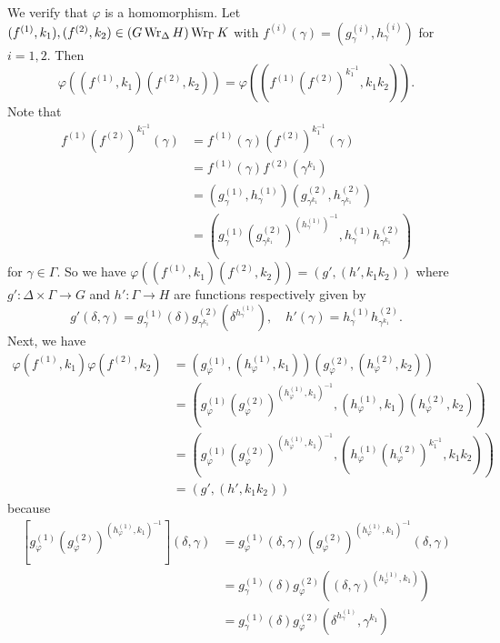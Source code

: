\begin{sketch}
We verify that $\varphi$ is a homomorphism. Let $(f^{(1)},k_1),(f^{(2)},k_2)\in (G\operatorname{Wr}_\Delta H) \operatorname{Wr}_\Gamma K$ with $f^{(i)}(\gamma) = (g^{(i)}_\gamma, h^{(i)}_\gamma)$  for $i=1,2$. Then
\begin{equation*}
	\varphi((f^{(1)},k_1)(f^{(2)},k_2)) = \varphi((f^{(1)}(f^{(2)})^{k_1^{-1}},k_1k_2)).
\end{equation*}
Note that 
\begin{align*}
	f^{(1)}(f^{(2)})^{k_1^{-1}}(\gamma) &= f^{(1)}(\gamma)(f^{(2)})^{k_1^{-1}}(\gamma) 
	\\
	&= 
	f^{(1)}(\gamma)f^{(2)}(\gamma^{k_1}) 
	\\
	&=(g^{(1)}_\gamma, h^{(1)}_\gamma)(g^{(2)}_{\gamma^{k_1}}, h^{(2)}_{\gamma^{k_1}})
	\\
	&= \left(g^{(1)}_\gamma (g^{(2)}_{\gamma^{k_1}})^{(h^{(1)}_\gamma)^{-1}}, h^{(1)}_\gamma h^{(2)}_{\gamma^{k_1}}\right)
\end{align*} for $\gamma\in\Gamma$. So we have $\varphi((f^{(1)},k_1)(f^{(2)},k_2)) = (g',(h',k_1k_2))$ where $g':\Delta\times\Gamma\to G$ and $h':\Gamma \to H$ are functions respectively given by
\begin{equation*}
	g'(\delta,\gamma) = g^{(1)}_\gamma(\delta)g^{(2)}_{\gamma^{k_1}}(\delta^{h_\gamma^{(1)}}),\quad h'(\gamma) = h^{(1)}_\gamma h^{(2)}_{\gamma^{k_1}}.
\end{equation*}
Next, we have 
\begin{align*}
	\varphi(f^{(1)},k_1) \varphi(f^{(2)},k_2) &= \left(g_\varphi^{(1)},(h_\varphi^{(1)},k_1)\right)\left(g_\varphi^{(2)},(h_\varphi^{(2)},k_2)\right)
	\\
	&= \left(g_\varphi^{(1)}(g_\varphi^{(2)})^{(h_\varphi^{(1)},k_1)^{-1}},(h_\varphi^{(1)},k_1)(h_\varphi^{(2)},k_2)\right)
	\\
	&=  \left(g_\varphi^{(1)}(g_\varphi^{(2)})^{(h_\varphi^{(1)},k_1)^{-1}},(h_\varphi^{(1)}(h_\varphi^{(2)})^{k_1^{-1}},k_1k_2)\right)
	\\
	&= (g',(h',k_1k_2))
\end{align*}
because
\begin{align*}
\left[g_\varphi^{(1)}(g_\varphi^{(2)})^{(h_\varphi^{(1)},k_1)^{-1}}\right] (\delta,\gamma) &= g_\varphi^{(1)}(\delta,\gamma) (g_\varphi^{(2)})^{(h_\varphi^{(1)},k_1)^{-1}}(\delta,\gamma)
\\
&= g_\gamma^{(1)}(\delta) g_\varphi^{(2)}((\delta,\gamma)^{(h_\varphi^{(1)},k_1)})
\\
&= g_\gamma^{(1)}(\delta) g_\varphi^{(2)}(\delta^{h_\gamma^{(1)}},\gamma^{k_1})
\\

\end{align*}
\end{sketch}
